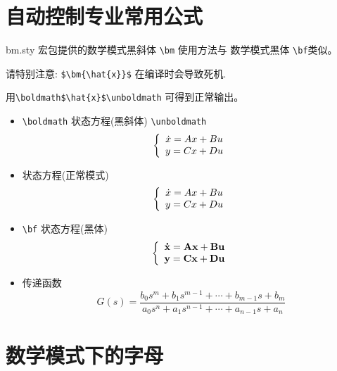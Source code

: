 \documentclass[12pt,a4paper]{article}
\begin{document}
\begin{CJK*}{UTF8}{song}

\newcommand{\aaa}{ABCDEFGHIJKLMNOPQRSTUVWXYZ abcdefghijklmnopqrstuvwxyz}
\newcommand{\bbb}{1234567890}

\section{自动控制专业常用公式}
bm.sty 宏包提供的数学模式黑斜体 \verb"\bm" 使用方法与 数学模式黑体 \verb"\bf"类似。

\textcolor[rgb]{0.98,0.00,0.00}{请特别注意:} \verb"$\bm{\hat{x}}$" \textcolor[rgb]{0.98,0.00,0.00}{在编译时会导致死机.}

\textcolor[rgb]{0.00,0.00,1.00}{用}\verb"\boldmath$\hat{x}$\unboldmath" \textcolor[rgb]{0.00,0.00,1.00}{可得到正常输出。}

\begin{itemize}
    \item{\verb"\boldmath" 状态方程(黑斜体) \verb"\unboldmath"}
\boldmath
    \[
\left\{ {\begin{array}{*{20}c}
   {\dot x = Ax + Bu}  \\
   {y = Cx + Du}  \\
\end{array}} \right.
    \]
\unboldmath
    \item{状态方程(正常模式)}
    \[
\left\{ {\begin{array}{*{20}c}
   {\dot x = Ax + Bu}  \\
   {y = Cx + Du}  \\
\end{array}} \right.
    \]
    \item{\verb"\bf" 状态方程(黑体)}
    \[
\left\{ {\begin{array}{*{20}c}
   {{\bf{\dot x}} = {\bf{Ax}} + {\bf{Bu}}}  \\
   {{\bf{y}} = {\bf{Cx}} + {\bf{Du}}}  \\
\end{array}} \right.
\]
    \item{传递函数}
    \[
G(s) = \frac{{b_0 s^m  + b_1 s^{m - 1}  +  \cdots  + b_{m - 1} s + b_m }}{{a_0 s^n  + a_1 s^{n - 1}  +  \cdots  + a_{n - 1} s + a_n }}
\]
\end{itemize}    

\section{数学模式下的字母}


\end{CJK*}
\end{document}
